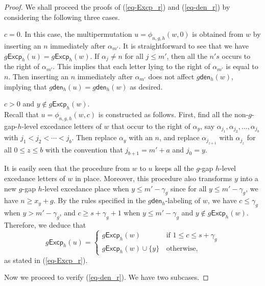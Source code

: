 \documentclass[10pt,a4paper]{amsart}
\def\Excp{\mathsf{Excp}}
\def\den{\mathsf{den}}
\begin{document}
\begin{proof}
We shall proceed the proofs of  (\ref{eq-Excp_r})	and (\ref{eq-den_r}) by considering the following three cases.

 $c=0$. 
In this case, the multipermutation $u=\phi_{n,g,h}(w, 0)$ is obtained from $w$ by inserting an $n$ immediately after $\alpha_{m'}$. It is straightforward to see that we have $ 
g\Excp_h(u)=g\Excp_h(w).
$ 	If $\alpha_j\neq n$ for all $j\leq m'$, then all the $n's$ occurs to the right of $\alpha_{m'}$. This implies that each letter lying to the right of $\alpha_{m'}$ is equal to $n$. Then inserting  an $n$ immediately after $\alpha_{m'}$ does not affect  $g\den_{h}(w)$, implying that 
$g\den_h(u)=g\den_h(w)$ as desired. 


  $c>0$ and $y\notin g\Excp_h(w)$.\\
Recall that $u=\phi_{n,g,h}(w,c)$ is constructed  as follows.
	First, find all the  non-$g$-gap-$h$-level excedance letters of $w$ that occur    to  the right  of $\alpha_{y}$, say $\alpha_{j_1}, \alpha_{j_2}, \ldots, \alpha_{j_b}$ with $ j_1<j_2<\cdots<j_b$.  Then  replace $\alpha_{y}$ with an  $n$,   and replace  $\alpha_{j_{z+1}}$ with $\alpha_{j_{z}}$ for all $0\leq z\leq b $ with the convention that $j_{b+1}=m'+a$ and $j_0=y$.
	
	It is easily seen that  the procedure  from $w$ to $u$ keeps  all the $g$-gap $h$-level excedance letters of $w$  in   place.  Moreover,   this  procedure  also transforms $y$ into   a new  $g$-gap $h$-level excedance place when $y\leq m'-\gamma_g$ since for all $y\leq m'-\gamma_g$, we have $n\geq x_{y}+g$. 
	By the rules specified in the $g\den_h$-labeling of $w$, we have $c\leq \gamma_g$ when $y>m'-\gamma_g$,  and   $c\geq s+\gamma_g+1$ when $y\leq m'-\gamma_g$ and $y\notin g\Excp_h(w)$.  Therefore, we deduce that
	 $$
	 	g\Excp_h(u)=\left\{ \begin{array}{ll}
	 	g\Excp_h(w)&\, \mathrm{if}\,\,   1\leq c\leq s+\gamma_g  \\
	 	g\Excp_h(w)\cup \{y\}&\, \mathrm{otherwise},
	 \end{array}
	 \right.
	 $$
	as stated in (\ref{eq-Excp_r}). 
	       
Now we proceed to verify  (\ref{eq-den_r}).  We have two subcases. 


\end{proof}
\end{document}
